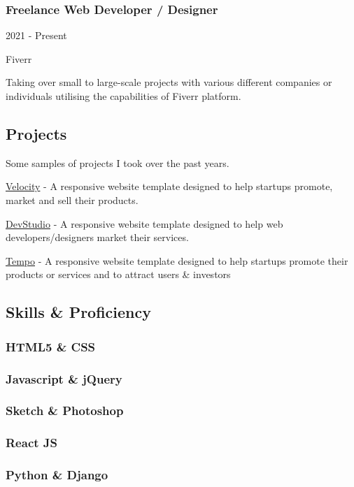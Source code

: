 \documentclass[
]{article}
\begin{document}
\hypertarget{freelance-web-developer-designer}{%
\subsubsection{Freelance Web Developer /
Designer}\label{freelance-web-developer-designer}}

2021 - Present

Fiverr

Taking over small to large-scale projects with various different
companies or individuals utilising the capabilities of Fiverr platform.

\hypertarget{projects}{%
\subsection{\texorpdfstring{{ \emph{} \emph{} }
Projects}{    Projects}}\label{projects}}

Some samples of projects I took over the past years.

{ \protect\hyperlink{hook}{Velocity} } - {A responsive website template
designed to help startups promote, market and sell their products.}

{ \protect\hyperlink{}{DevStudio} } - {A responsive website template
designed to help web developers/designers market their services.}

{ \protect\hyperlink{}{Tempo} } - {A responsive website template
designed to help startups promote their products or services and to
attract users \& investors}

\hypertarget{skills-proficiency}{%
\subsection{\texorpdfstring{{ \emph{} \emph{} } Skills \&
Proficiency}{    Skills \& Proficiency}}\label{skills-proficiency}}

\hypertarget{html5-css}{%
\subsubsection{HTML5 \& CSS}\label{html5-css}}

\hypertarget{javascript-jquery}{%
\subsubsection{Javascript \& jQuery}\label{javascript-jquery}}

\hypertarget{sketch-photoshop}{%
\subsubsection{Sketch \& Photoshop}\label{sketch-photoshop}}

\hypertarget{react-js}{%
\subsubsection{React JS}\label{react-js}}

\hypertarget{python-django}{%
\subsubsection{Python \& Django}\label{python-django}}

{}
\end{document}
